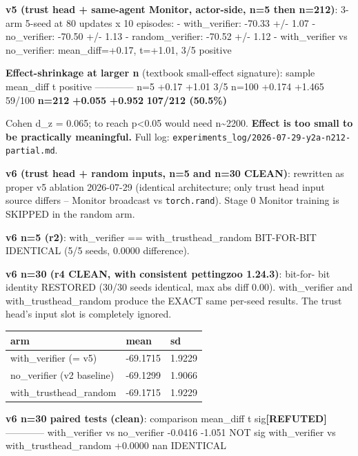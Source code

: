 \documentclass[
]{article}
\newcounter{none} %
\begin{document}
\textbf{v5 (trust head + same-agent Monitor, actor-side, n=5 then
n=212)}: 3-arm 5-seed at 80 updates x 10 episodes: - with\_verifier:
-70.33 +/- 1.07 - no\_verifier: -70.50 +/- 1.13 - random\_verifier:
-70.52 +/- 1.12 - with\_verifier vs no\_verifier: mean\_diff=+0.17,
t=+1.01, 3/5 positive

\textbf{Effect-shrinkage at larger n} (textbook small-effect signature):
\textbar{} sample \textbar{} mean\_diff \textbar{} t \textbar{} positive
\textbar{} \textbar---\textbar---\textbar---\textbar---\textbar{}
\textbar{} n=5 \textbar{} +0.17 \textbar{} +1.01 \textbar{} 3/5
\textbar{} \textbar{} n=100 \textbar{} +0.174 \textbar{} +1.465
\textbar{} 59/100 \textbar{} \textbar{} \textbf{n=212} \textbar{}
\textbf{+0.055} \textbar{} \textbf{+0.952} \textbar{} \textbf{107/212
(50.5\%)} \textbar{}

Cohen d\_z = 0.065; to reach p\textless0.05 would need
n\textasciitilde2200. \textbf{Effect is too small to be practically
meaningful.} Full log:
\texttt{experiments\_log/2026-07-29-y2a-n212-partial.md}.

\textbf{v6 (trust head + random inputs, n=5 and n=30 CLEAN)}: rewritten
as proper v5 ablation 2026-07-29 (identical architecture; only trust
head input source differs -- Monitor broadcast vs \texttt{torch.rand}).
Stage 0 Monitor training is SKIPPED in the random arm.

\textbf{v6 n=5 (r2)}: with\_verifier == with\_trusthead\_random
BIT-FOR-BIT IDENTICAL (5/5 seeds, 0.0000 difference).

\textbf{v6 n=30 (r4 CLEAN, with consistent pettingzoo 1.24.3)}: bit-for-
bit identity RESTORED (30/30 seeds identical, max abs diff 0.00).
with\_verifier and with\_trusthead\_random produce the EXACT same
per-seed results. The trust head's input slot is completely ignored.

{\def\LTcaptype{none} %
\begin{longtable}[]{@{}lll@{}}
\toprule\noalign{}
arm & mean & sd \\
\midrule\noalign{}
\endhead
\bottomrule\noalign{}
\endlastfoot
with\_verifier (= v5) & -69.1715 & 1.9229 \\
no\_verifier (v2 baseline) & -69.1299 & 1.9066 \\
with\_trusthead\_random & -69.1715 & 1.9229 \\
\end{longtable}
}

\textbf{v6 n=30 paired tests (clean)}: \textbar{} comparison \textbar{}
mean\_diff \textbar{} t \textbar{} sig\textbf{{[}REFUTED{]}} \textbar{}
\textbar---\textbar---\textbar---\textbar---\textbar{} \textbar{}
with\_verifier vs no\_verifier \textbar{} -0.0416 \textbar{} -1.051
\textbar{} NOT sig \textbar{} \textbar{} with\_verifier vs
with\_trusthead\_random \textbar{} +0.0000 \textbar{} nan \textbar{}
IDENTICAL \textbar{}
\end{document}
